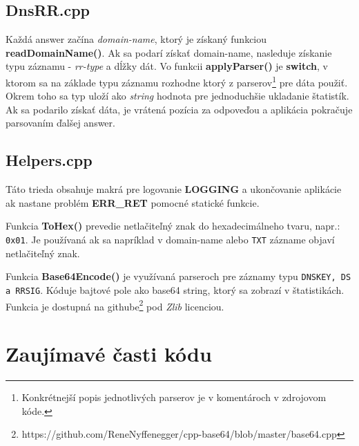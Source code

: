 \documentclass{article}
\begin{document}
        \subsection{DnsRR.cpp}
        Každá answer začína \emph{domain-name}, ktorý je získaný funkciou \textbf{readDomainName()}. Ak sa podarí získať domain-name, nasleduje získanie typu záznamu - \emph{rr-type} a dĺžky dát.
        Vo funkcii \textbf{applyParser()} je \textbf{switch}, v ktorom sa na základe typu záznamu rozhodne ktorý z parserov\footnote{Konkrétnejší popis jednotlivých parserov je v komentároch v zdrojovom kóde.} pre dáta použiť. Okrem toho sa typ uloží ako \emph{string}
        hodnota pre jednoduchšie ukladanie štatistík. Ak sa podarilo získať dáta, je vrátená pozícia za odpoveďou a aplikácia pokračuje parsovaním ďalšej answer.

        \subsection{Helpers.cpp}
        Táto trieda obsahuje makrá pre logovanie \textbf{LOGGING} a ukončovanie aplikácie ak nastane problém \textbf{ERR_RET} pomocné statické funkcie.

        Funkcia \textbf{ToHex()} prevedie netlačiteľný znak do hexadecimálneho tvaru, napr.: \texttt{0x01}. Je používaná ak sa napríklad v domain-name alebo \texttt{TXT}
        zázname objaví netlačiteľný znak.

        Funkcia \textbf{Base64Encode()} je využívaná parseroch pre záznamy typu \texttt{DNSKEY, DS a RRSIG}. Kóduje bajtové pole ako base64 string, ktorý sa zobrazí v štatistikách.
        Funkcia je dostupná na githube\footnote{https://github.com/ReneNyffenegger/cpp-base64/blob/master/base64.cpp} pod \emph{Zlib} licenciou. 
    
    \section{Zaujímavé časti kódu}
\end{document}
